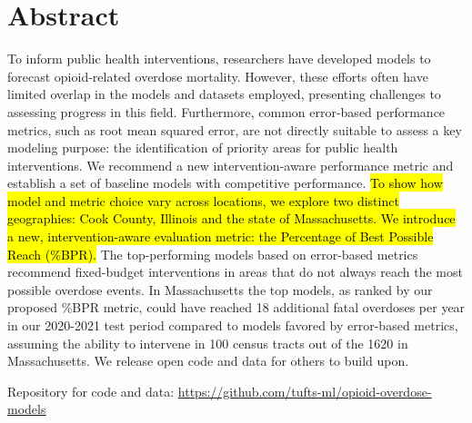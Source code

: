 \section{Abstract}\label{abstract}

To inform public health interventions, researchers have developed models to forecast opioid-related overdose mortality. However, these efforts often have limited overlap in the models and datasets employed, presenting challenges to assessing progress in this field. Furthermore, common error-based performance metrics, such as root mean squared error, are not directly suitable to assess a key modeling purpose: the identification of priority areas for public health interventions. We recommend a new intervention-aware performance metric and establish a set of baseline models with competitive performance. \hl{To show how model and metric choice vary across locations, we explore two distinct geographies: Cook County, Illinois and the state of Massachusetts. We introduce a new, intervention-aware evaluation metric: the Percentage of Best Possible Reach (\%BPR).} The top-performing models based on error-based metrics recommend fixed-budget interventions in areas that do not always reach the most possible overdose events. In Massachusetts the top models, as ranked by our proposed \%BPR metric, could have reached 18 additional fatal overdoses per year in our 2020-2021 test period compared to models favored by error-based metrics, assuming the ability to intervene in 100 census tracts out of the 1620 in Massachusetts. We release open code and data for others to build upon.

Repository for code and data: \href{https://github.com/tufts-ml/opioid-overdose-models}{\ul{https://github.com/tufts-ml/opioid-overdose-models}}
